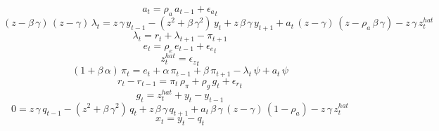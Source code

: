 \documentclass[10pt,a4paper]{article}
\begin{document}
\footnotesize
\begin{dmath}
a_{t}={\rho_a}\, a_{t-1}+{\epsilon_a}_{t}
\end{dmath}
\begin{dmath}
\left({z}-{\beta}\, {\gamma}\right)\, \left({z}-{\gamma}\right)\, \lambda_{t}={z}\, {\gamma}\, y_{t-1}-\left({z}^{2}+{\beta}\, {\gamma}^{2}\right)\, y_{t}+{z}\, {\beta}\, {\gamma}\, y_{t+1}+a_{t}\, \left({z}-{\gamma}\right)\, \left({z}-{\rho_a}\, {\beta}\, {\gamma}\right)-{z}\, {\gamma}\, z^{hat}_{t}
\end{dmath}
\begin{dmath}
\lambda_{t}=r_{t}+\lambda_{t+1}-\pi_{t+1}
\end{dmath}
\begin{dmath}
e_{t}={\rho_e}\, e_{t-1}+{\epsilon_e}_{t}
\end{dmath}
\begin{dmath}
z^{hat}_{t}={\epsilon_z}_{t}
\end{dmath}
\begin{dmath}
\left(1+{\beta}\, {\alpha}\right)\, \pi_{t}=e_{t}+{\alpha}\, \pi_{t-1}+{\beta}\, \pi_{t+1}-\lambda_{t}\, {\psi}+a_{t}\, {\psi}
\end{dmath}
\begin{dmath}
r_{t}-r_{t-1}=\pi_{t}\, {\rho_\pi}+{\rho_g}\, g_{t}+{\epsilon_r}_{t}
\end{dmath}
\begin{dmath}
g_{t}=z^{hat}_{t}+y_{t}-y_{t-1}
\end{dmath}
\begin{dmath}
0={z}\, {\gamma}\, q_{t-1}-\left({z}^{2}+{\beta}\, {\gamma}^{2}\right)\, q_{t}+{z}\, {\beta}\, {\gamma}\, q_{t+1}+a_{t}\, {\beta}\, {\gamma}\, \left({z}-{\gamma}\right)\, \left(1-{\rho_a}\right)-{z}\, {\gamma}\, z^{hat}_{t}
\end{dmath}
\begin{dmath}
x_{t}=y_{t}-q_{t}
\end{dmath}
\end{document}
